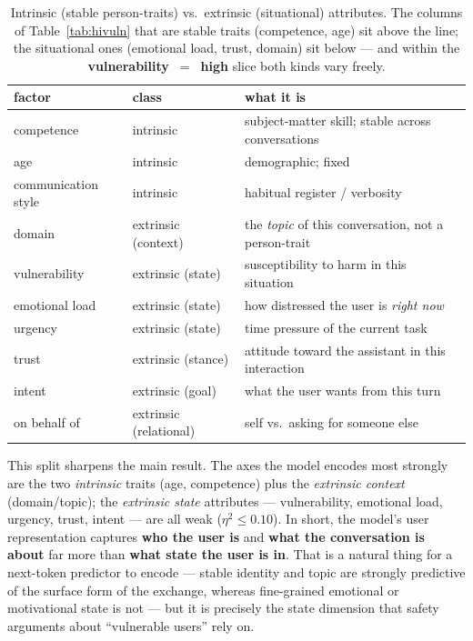 \documentclass[11pt]{article}
\begin{document}
\begin{table}[h]
\centering\small
\caption{Intrinsic (stable person-traits) vs.\ extrinsic (situational) attributes.
The columns of Table~\ref{tab:hivuln} that are stable traits (competence, age) sit
above the line; the situational ones (emotional load, trust, domain) sit below --- and
within the \textbf{vulnerability~$=$~high} slice both kinds vary freely.}
\label{tab:intrinsic}
\begin{tabular}{@{}lll@{}}
\toprule
factor & class & what it is \\
\midrule
competence & intrinsic & subject-matter skill; stable across conversations \\
age & intrinsic & demographic; fixed \\
communication style & intrinsic & habitual register / verbosity \\
\midrule
domain & extrinsic (context) & the \emph{topic} of this conversation, not a person-trait \\
vulnerability & extrinsic (state) & susceptibility to harm in this situation \\
emotional load & extrinsic (state) & how distressed the user is \emph{right now} \\
urgency & extrinsic (state) & time pressure of the current task \\
trust & extrinsic (stance) & attitude toward the assistant in this interaction \\
intent & extrinsic (goal) & what the user wants from this turn \\
on behalf of & extrinsic (relational) & self vs.\ asking for someone else \\
\bottomrule
\end{tabular}
\end{table}

This split sharpens the main result. The axes the model encodes most strongly are the
two \emph{intrinsic} traits (age, competence) plus the \emph{extrinsic context}
(domain/topic); the \emph{extrinsic state} attributes --- vulnerability, emotional load,
urgency, trust, intent --- are all weak ($\eta^2 \le 0.10$). In short, the model's user
representation captures \textbf{who the user is} and \textbf{what the conversation is
about} far more than \textbf{what state the user is in}. That is a natural thing for a
next-token predictor to encode --- stable identity and topic are strongly predictive of
the surface form of the exchange, whereas fine-grained emotional or motivational state
is not --- but it is precisely the state dimension that safety arguments about
``vulnerable users'' rely on.
\end{document}

